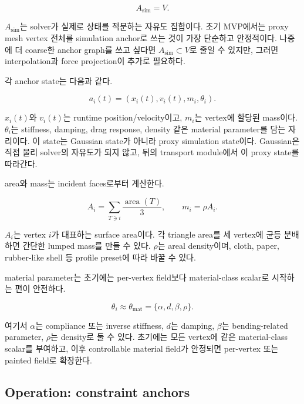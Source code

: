 \documentclass[11pt,a4paper]{article}
\begin{document}
\begin{equation}
A_{\mathrm{sim}}=V.
\end{equation}

$A_{\mathrm{sim}}$는 solver가 실제로 상태를 적분하는 자유도 집합이다.
초기 MVP에서는 proxy mesh vertex 전체를 simulation anchor로 쓰는 것이 가장 단순하고 안정적이다.
나중에 더 coarse한 anchor graph를 쓰고 싶다면 $A_{\mathrm{sim}}\subset V$로 줄일 수 있지만, 그러면 interpolation과 force projection이 추가로 필요하다.

각 anchor state는 다음과 같다.

\begin{equation}
a_i(t)=(x_i(t),v_i(t),m_i,\theta_i).
\end{equation}

$x_i(t)$와 $v_i(t)$는 runtime position/velocity이고, $m_i$는 vertex에 할당된 mass이다.
$\theta_i$는 stiffness, damping, drag response, density 같은 material parameter를 담는 자리이다.
이 state는 Gaussian state가 아니라 proxy simulation state이다.
Gaussian은 직접 물리 solver의 자유도가 되지 않고, 뒤의 transport module에서 이 proxy state를 따라간다.

area와 mass는 incident faces로부터 계산한다.

\begin{equation}
A_i=\sum_{T\ni i}\frac{\operatorname{area}(T)}{3},\qquad m_i=\rho A_i.
\end{equation}

$A_i$는 vertex $i$가 대표하는 surface area이다.
각 triangle area를 세 vertex에 균등 분배하면 간단한 lumped mass를 만들 수 있다.
$\rho$는 areal density이며, cloth, paper, rubber-like shell 등 profile preset에 따라 바꿀 수 있다.

material parameter는 초기에는 per-vertex field보다 material-class scalar로 시작하는 편이 안전하다.

\begin{equation}
\theta_i\approx\theta_{\mathrm{mat}}=\{\alpha,d,\beta,\rho\}.
\end{equation}

여기서 $\alpha$는 compliance 또는 inverse stiffness, $d$는 damping, $\beta$는 bending-related parameter, $\rho$는 density로 둘 수 있다.
초기에는 모든 vertex에 같은 material-class scalar를 부여하고, 이후 controllable material field가 안정되면 per-vertex 또는 painted field로 확장한다.

\subsection*{Operation: constraint anchors}
\end{document}
